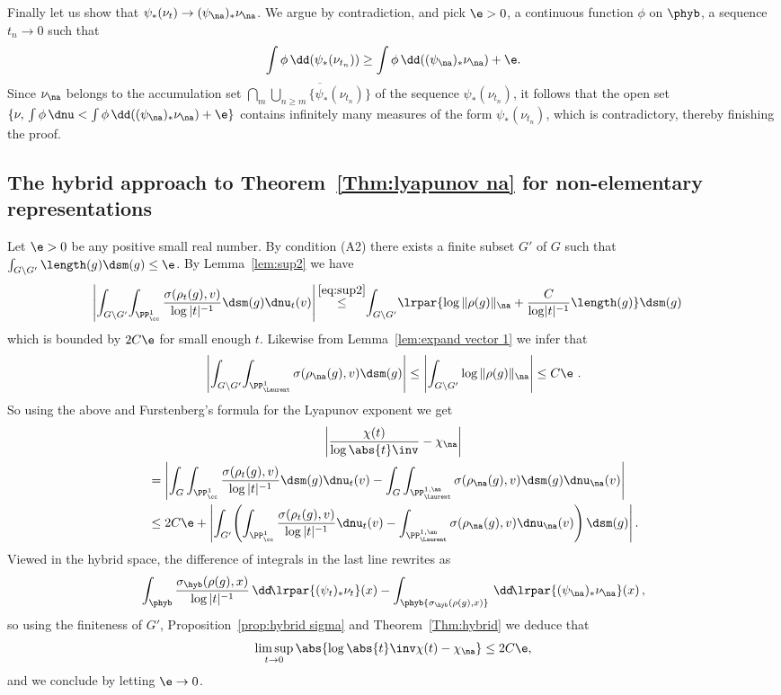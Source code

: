 
Finally let us show that $\psi_*(\nu_t) \to(\psi_\na)_* \nu_{\na}$. We argue by contradiction, and pick $\e>0$, a continuous function $\phi$ on $\phyb$, a sequence $t_n\to0$ such that
\[
\int \phi \, \dd(\psi_*(\nu_{t_n})) \ge \int \phi\, \dd((\psi_\na)_*\nu_{\na}) + \e.
\]
Since $\nu_{\na}$ belongs to the accumulation set $\bigcap_m \overline{\bigcup_{n\ge m} \{\psi_*(\nu_{t_n})\}}$ of the sequence $\psi_*(\nu_{t_n})$, it follows that the open set $\{ \nu, \, \int \phi \, \dnu < \int \phi\, \dd((\psi_\na)_*\nu_{\na}) + \e\}$ contains infinitely many measures of the form $\psi_*(\nu_{t_n})$, which is contradictory, thereby finishing the proof.

\subsection{The hybrid approach to Theorem~\ref{Thm:lyapunov na} for non-elementary representations}

Let $\e>0$ be any positive small real number. By condition (A2) there exists a finite subset $G'$ of $G$ such that $\int_{G\setminus G'} \length(g) \dsm(g) \le \e$. By Lemma~\ref{lem:sup2} we have
\begin{align*}
\left|
\int_{G\setminus G'} \! \int_{\PP^1_\cc} \frac{\sigma(\rho_t(g),v)}{\log|t|^{-1}} \dsm(g)\dnu_t(v)
\right| &\mathop{\le}\limits^{\eqref{eq:sup2}}\!
\int_{G\setminus G'}\!
\lrpar{ \log \|\rho(g)\|_{\na} + \frac{C}{\log\mathopen|t\mathclose|^{-1}}
\length(g) }\dsm(g)
\end{align*}
which is bounded by $ 2C\e$ for small enough $t$. Likewise from Lemma~\ref{lem:expand vector 1} we infer that
\[
\left|\int_{G\setminus G'} \! \int_{\PP^1_{\Laurent}} \sigma(\rho_\na(g), v) \dsm(g) \right|
\le
\left|\int_{G\setminus G'} \log \|\rho(g)\|_{\na}\right|
\le C\e~.
\]
So using the above and Furstenberg's formula for the Lyapunov exponent we get
\begin{multline*}
\left| \frac{\chi(t)}{\log\abs{t}\inv} - \chi_{\na} \right|\\
\begin{aligned}
&= \left|
\int_{G} \int_{\PP^1_\cc} \frac{\sigma(\rho_t(g),v)}{\log|t|^{-1}} \dsm(g) \dnu_t(v) -
\int_{G}\int_{\PP^{1,\an}_{\Laurent}} \sigma(\rho_\na(g), v) \dsm(g) \dnu_\na(v)
\right|
\\
& \le 2 C \e +
\left|
\int_{G'} \! \left(
\int_{\PP^1_\cc} \frac{\sigma(\rho_t(g),v)}{\log|t|^{-1}} \dnu_t(v) - \int_{\PP^{1,\an}_{\Laurent}} \sigma(\rho_\na(g), v) \dnu_\na(v)
\right) \dsm(g)
\right|.
\end{aligned}
\end{multline*}
Viewed in the hybrid space, the difference of integrals in the last line rewrites as
\[
\int_\phyb \frac{\sigma_{\hyb}(\rho(g),x)}{\log|t|^{-1}} \,\dd\!\lrpar{(\psi_t)_*\nu_t }(x) - \int_\phyb {\sigma_{\hyb}(\rho(g),x)} \,\dd\! \lrpar{(\psi_\na)_*\nu_\na}(x)
\,,
\]
so using the finiteness of $G'$, Proposition~\ref{prop:hybrid sigma} and Theorem~\ref{Thm:hybrid} we deduce that
\[
\limsup_{t\to0} \abs{\log\abs{t}\inv \chi(t) - \chi_{\na} }\le 2C \e,
\]
and we conclude
by letting $\e\to0$.

